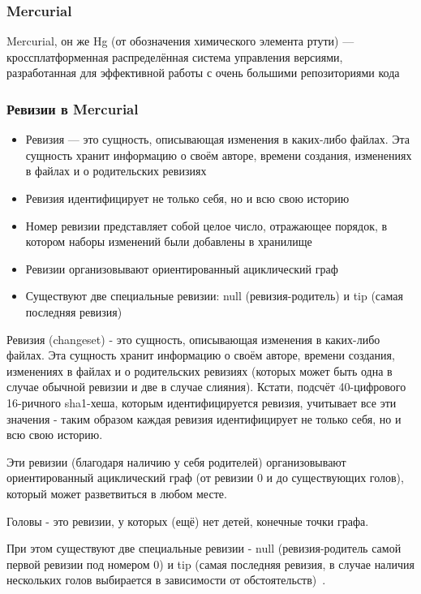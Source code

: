 \documentclass{../industrial-development}
\begin{document}
\begin{frame} \frametitle{Mercurial}
  \begin{block}{}
    \alert{Mercurial, он же Hg (от обозначения химического элемента ртути)} --- кроссплатформенная распределённая система управления версиями, разработанная для эффективной работы с очень большими репозиториями кода
  \end{block}
\end{frame}

\begin{frame} \frametitle{Ревизии в Mercurial}
  \begin{itemize}
  \item Ревизия --- это сущность, описывающая изменения в каких-либо файлах. Эта сущность хранит информацию о своём авторе, времени создания, изменениях в файлах и о родительских ревизиях
  \item Ревизия идентифицирует не только себя, но и всю свою историю
  \item Номер ревизии представляет собой целое число, отражающее порядок, в котором наборы изменений были добавлены в хранилище
  \item Ревизии организовывают ориентированный ациклический граф
  \item Существуют две специальные ревизии: null (ревизия-родитель) и tip (самая последняя ревизия)
  \end{itemize}
\end{frame}

\lecturenotes

Ревизия (changeset) - это сущность, описывающая изменения в каких-либо файлах. Эта сущность хранит информацию о своём авторе, времени создания, изменениях в файлах и о родительских ревизиях (которых может быть одна в случае обычной ревизии и две в случае слияния). Кстати, подсчёт 40-цифрового 16-ричного sha1-хеша, которым идентифицируется ревизия, учитывает все эти значения - таким образом каждая ревизия идентифицирует не только себя, но и всю свою историю.

Эти ревизии (благодаря наличию у себя родителей) организовывают ориентированный ациклический граф (от ревизии 0 и до существующих голов), который может разветвиться в любом месте.

Головы - это ревизии, у которых (ещё) нет детей, конечные точки графа.

При этом существуют две специальные ревизии - null (ревизия-родитель самой первой ревизии под номером 0) и tip (самая последняя ревизия, в случае наличия нескольких голов выбирается в зависимости от обстоятельств)~\cite{MercurialSolovyov}.
\end{document}
